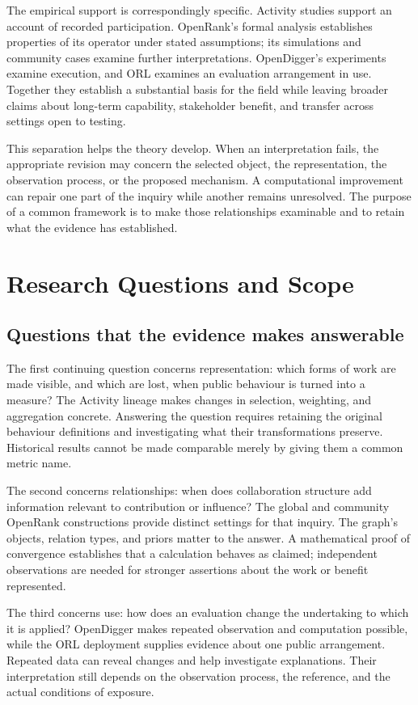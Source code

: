 The empirical support is correspondingly specific. Activity studies support an account of recorded participation. OpenRank's formal analysis establishes properties of its operator under stated assumptions; its simulations and community cases examine further interpretations. OpenDigger's experiments examine execution, and ORL examines an evaluation arrangement in use. Together they establish a substantial basis for the field while leaving broader claims about long-term capability, stakeholder benefit, and transfer across settings open to testing.

This separation helps the theory develop. When an interpretation fails, the appropriate revision may concern the selected object, the representation, the observation process, or the proposed mechanism. A computational improvement can repair one part of the inquiry while another remains unresolved. The purpose of a common framework is to make those relationships examinable and to retain what the evidence has established.

\section{Research Questions and Scope}
\label{sec:programme}

\subsection{Questions that the evidence makes answerable}
The first continuing question concerns representation: which forms of work are made visible, and which are lost, when public behaviour is turned into a measure? The Activity lineage makes changes in selection, weighting, and aggregation concrete. Answering the question requires retaining the original behaviour definitions and investigating what their transformations preserve. Historical results cannot be made comparable merely by giving them a common metric name.

The second concerns relationships: when does collaboration structure add information relevant to contribution or influence? The global and community OpenRank constructions provide distinct settings for that inquiry. The graph's objects, relation types, and priors matter to the answer. A mathematical proof of convergence establishes that a calculation behaves as claimed; independent observations are needed for stronger assertions about the work or benefit represented.

The third concerns use: how does an evaluation change the undertaking to which it is applied? OpenDigger makes repeated observation and computation possible, while the ORL deployment supplies evidence about one public arrangement. Repeated data can reveal changes and help investigate explanations. Their interpretation still depends on the observation process, the reference, and the actual conditions of exposure.

